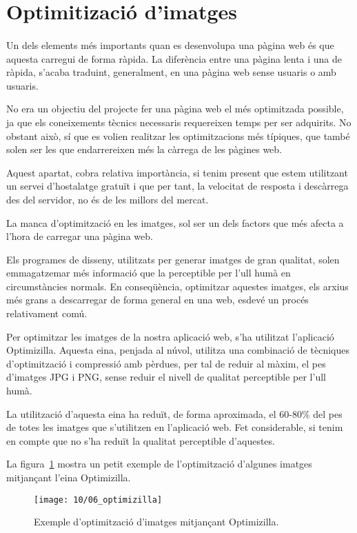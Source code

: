 \section{Optimitizació d'imatges}

    \paragraph{}
    Un dels elements més importants quan es desenvolupa una pàgina web és que aques\-ta carregui de forma ràpida. La diferència entre una pàgina lenta i una de rà\-pi\-da, s'acaba traduint, generalment, en una pàgina web sense usuaris o amb usuaris.

    No era un objectiu del projecte fer una pàgina web el més optimitzada possible, ja que els coneixements tècnics necessaris requereixen temps per ser adquirits. No obstant això, sí que es volien realitzar les optimitzacions més típiques, que també solen ser les que endarrereixen més la càrrega de les pàgines web.

    Aquest apartat, cobra relativa importància, si tenim present que estem utilitzant un servei d'hostalatge gratuït i que per tant, la velocitat de resposta i descàrrega des del servidor, no és de les millors del mercat.

    La manca d'optimització en les imatges, sol ser un dels factors que més afecta a l'hora de carregar una pàgina web.

    Els programes de disseny, utilitzats per generar imatges de gran qualitat, solen emmagatzemar més informació que la perceptible per l'ull humà en circumstàncies normals. En conseqüència, optimitzar aquestes imatges, els arxius més grans a descarregar de forma general en una web, esdevé un procés relativament comú.

    Per optimitzar les imatges de la nostra aplicació web, s'ha utilitzat l'aplicació Optimizilla. Aquesta eina, penjada al núvol, utilitza una combinació de tècniques d'optimització i compressió amb pèrdues, per tal de reduir al màxim, el pes d'imatges JPG i PNG, sense reduir el nivell de qualitat perceptible per l'ull humà.

    La utilització d'aquesta eina ha reduït, de forma aproximada, el 60-80\% del pes de totes les imatges que s'utilitzen en l'aplicació web. Fet considerable, si tenim en compte que no s'ha reduït la qualitat perceptible d'aquestes.

    La figura~\ref{img:optimizilla} mostra un petit exemple de l'optimització d'algunes imatges mitjançant l'eina Optimizilla.

    \begin{figure}[h]
        \texttt{[image: 10/06\_optimizilla]}
        \centering
        \caption{Exemple d'optimització d'imatges mitjançant Optimizilla.}\label{img:optimizilla}
    \end{figure}
